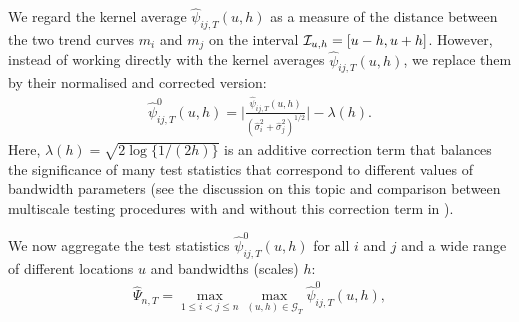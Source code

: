 \documentclass[a4paper,12pt]{article}
\begin{document}
We regard the kernel average $\widehat{\psi}_{ij, T}(u, h)$ as a measure of the distance between the two trend curves $m_i$ and $m_j$ on the interval $\mathcal{I}_{u, h} = [u-h, u+h]$. However, instead of working directly with the kernel averages $\widehat{\psi}_{ij, T}(u, h)$, we replace them by their normalised and corrected version:
\begin{align}\label{eq:psi_zero_ij}
\hat{\psi}^0_{ij, T}(u, h) =  \Big|\frac{\widehat{\psi}_{ij, T}(u, h)}{(\widehat{\sigma}_i^2 + \widehat{\sigma}_j^2)^{1/2}}\Big| - \lambda(h).
\end{align}
Here, $\lambda(h) = \sqrt{2 \log \{ 1/(2h) \}}$ is an additive correction term that balances the significance of many test statistics that correspond to different values of bandwidth parameters (see the discussion on this topic and comparison between multiscale testing procedures with and without this correction term in \citet{KhismatullinaVogt2020}).

We now aggregate the test statistics $\hat{\psi}^0_{ij, T}(u, h)$ for all $i$ and $j$ and a wide range of different locations $u$ and bandwidths (scales) $h$:
\begin{align}\label{eq:Psi_hat}
	\widehat{\Psi}_{n,T} = \max_{1 \le i < j \le n}\max_{(u, h) \in \mathcal{G}_T} \hat{\psi}^0_{ij, T}(u, h),
\end{align}
\end{document}
